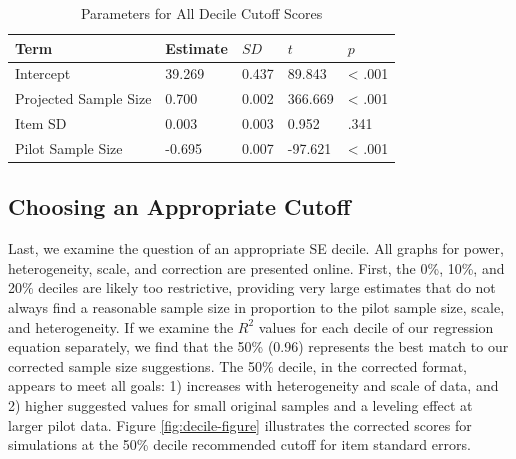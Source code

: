 \documentclass[
  man]{apa6}
\begin{document}
\begin{table}[tbp]

\begin{center}
\begin{threeparttable}

\caption{\label{tab:table-correction}Parameters for All Decile Cutoff Scores}

\begin{tabular}{lllll}
\toprule
Term & Estimate & $SD$ & $t$ & $p$\\
\midrule
Intercept & 39.269 & 0.437 & 89.843 & < .001\\
Projected Sample Size & 0.700 & 0.002 & 366.669 & < .001\\
Item SD & 0.003 & 0.003 & 0.952 & .341\\
Pilot Sample Size & -0.695 & 0.007 & -97.621 & < .001\\
\bottomrule
\end{tabular}

\end{threeparttable}
\end{center}

\end{table}

\hypertarget{choosing-an-appropriate-cutoff}{%
\subsection{Choosing an Appropriate Cutoff}\label{choosing-an-appropriate-cutoff}}

Last, we examine the question of an appropriate SE decile. All graphs for power, heterogeneity, scale, and correction are presented online. First, the 0\%, 10\%, and 20\% deciles are likely too restrictive, providing very large estimates that do not always find a reasonable sample size in proportion to the pilot sample size, scale, and heterogeneity. If we examine the \(R^2\) values for each decile of our regression equation separately, we find that the 50\% (0.96) represents the best match to our corrected sample size suggestions. The 50\% decile, in the corrected format, appears to meet all goals: 1) increases with heterogeneity and scale of data, and 2) higher suggested values for small original samples and a leveling effect at larger pilot data. Figure \ref{fig:decile-figure} illustrates the corrected scores for simulations at the 50\% decile recommended cutoff for item standard errors.
\end{document}
